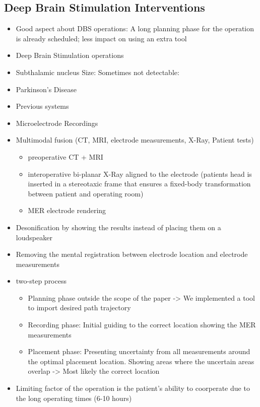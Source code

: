 \subsection{Deep Brain Stimulation Interventions}
\label{contributions:medbio:dbs}
\begin{itemize}
\item Good aspect about DBS operations: A long planning phase for the operation is already scheduled; less impact on using an extra tool
\item Deep Brain Stimulation operations \cite{Lindberg2002} \cite{Benabid2009}
\item Subthalamic nucleus Size: \cite{Richter2004} Sometimes not detectable: \cite{Starr2002}
\item Parkinson's Disease
\item Previous systems
\item Microelectrode Recordings \cite{Lenz1988}
\item Multimodal fusion (CT, MRI, electrode measurements, X-Ray, Patient tests)
\begin{itemize}
    \item preoperative CT + MRI
    \item interoperative bi-planar X-Ray aligned to the electrode (patients head is inserted in a stereotaxic frame that ensures a fixed-body transformation between patient and operating room)
    \item MER electrode rendering
\end{itemize}
\item Desonification by showing the results instead of placing them on a loudspeaker
\item Removing the mental registration between electrode location and electrode measurements
\item two-step process
\begin{itemize}
    \item Planning phase outside the scope of the paper -> We implemented a tool to import desired path trajectory \cite{Shamir2010}
    \item Recording phase: Initial guiding to the correct location showing the MER measurements
    \item Placement phase: Presenting uncertainty from all measurements around the optimal placement location. Showing areas where the uncertain areas overlap -> Most likely the correct location
\end{itemize}
\item Limiting factor of the operation is the patient's ability to coorperate due to the long operating times (6-10 hours)

\end{itemize}
